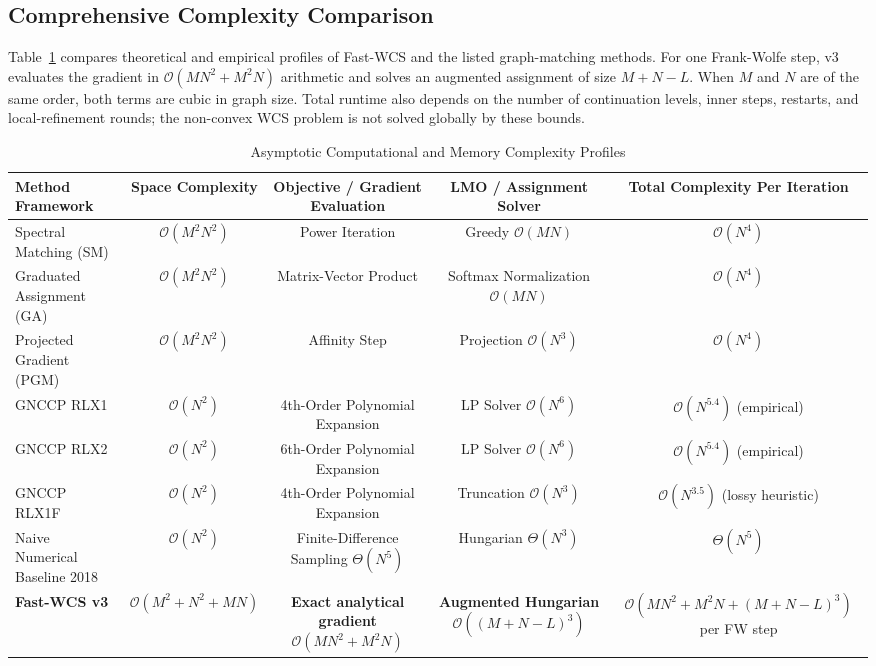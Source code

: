 \documentclass[conference]{IEEEtran}
\begin{document}
\subsection{Comprehensive Complexity Comparison}

Table~\ref{tab:complexity_comparison} compares theoretical and empirical profiles of Fast-WCS and the listed graph-matching methods. For one Frank-Wolfe step, v3 evaluates the gradient in $\mathcal{O}(MN^2+M^2N)$ arithmetic and solves an augmented assignment of size $M+N-L$. When $M$ and $N$ are of the same order, both terms are cubic in graph size. Total runtime also depends on the number of continuation levels, inner steps, restarts, and local-refinement rounds; the non-convex WCS problem is not solved globally by these bounds.

\begin{table}[t]
\centering
\caption{Asymptotic Computational and Memory Complexity Profiles}
\label{tab:complexity_comparison}
\fontsize{7.2}{8.6}\selectfont
\setlength{\tabcolsep}{3.0pt}
\begin{tabular*}{\textwidth}{@{\extracolsep{\fill}}lcccc@{}}
\toprule
\textbf{Method Framework} & \textbf{Space Complexity} & \textbf{Objective / Gradient Evaluation} & \textbf{LMO / Assignment Solver} & \textbf{Total Complexity Per Iteration} \\
\midrule
Spectral Matching (SM) \cite{leordeanu2005} & $\mathcal{O}(M^2 N^2)$ & Power Iteration & Greedy $\mathcal{O}(MN)$ & $\mathcal{O}(N^4)$ \\
Graduated Assignment (GA) \cite{gold1996} & $\mathcal{O}(M^2 N^2)$ & Matrix-Vector Product & Softmax Normalization $\mathcal{O}(MN)$ & $\mathcal{O}(N^4)$ \\
Projected Gradient (PGM) \cite{zaslavskiy2009} & $\mathcal{O}(M^2 N^2)$ & Affinity Step & Projection $\mathcal{O}(N^3)$ & $\mathcal{O}(N^4)$ \\
\midrule
GNCCP RLX1 \cite{yang2018algorithm} & $\mathcal{O}(N^2)$ & 4th-Order Polynomial Expansion & LP Solver $\mathcal{O}(N^6)$ & $\mathcal{O}(N^{5.4})$ (empirical) \\
GNCCP RLX2 \cite{yang2018algorithm} & $\mathcal{O}(N^2)$ & 6th-Order Polynomial Expansion & LP Solver $\mathcal{O}(N^6)$ & $\mathcal{O}(N^{5.4})$ (empirical) \\
GNCCP RLX1F \cite{yang2018algorithm} & $\mathcal{O}(N^2)$ & 4th-Order Polynomial Expansion & Truncation $\mathcal{O}(N^3)$ & $\mathcal{O}(N^{3.5})$ (lossy heuristic) \\
Naive Numerical Baseline 2018 & $\mathcal{O}(N^2)$ & Finite-Difference Sampling $\Theta(N^5)$ & Hungarian $\Theta(N^3)$ & $\Theta(N^5)$ \\
\midrule
\textbf{Fast-WCS v3} & $\mathcal{O}(M^2+N^2+MN)$ & \textbf{Exact analytical gradient $\mathcal{O}(MN^2+M^2N)$} & \textbf{Augmented Hungarian $\mathcal{O}((M+N-L)^3)$} & $\mathcal{O}(MN^2+M^2N+(M+N-L)^3)$ per FW step \\
\bottomrule
\end{tabular*}
\end{table}
\end{document}
